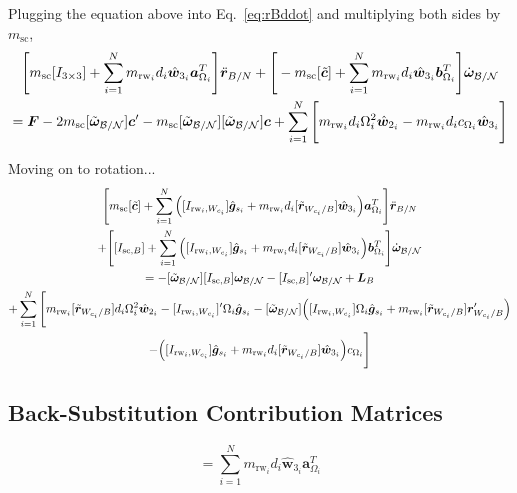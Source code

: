 \documentclass[]{BasiliskReportMemo}
\begin{document}
Plugging the equation above into Eq.~\eqref{eq:rBddot} and multiplying both sides by $m_\text{sc}$,
\begin{multline}
\Bigg[m_{\text{sc}}[I_{3\times3}] +\sum\limits_{i=1}^{N}m_{\text{rw}_i}d_i\hat{\bm{w}}_{3_i}\bm{a}_{\Omega_i}^T \Bigg]\ddot{\bm r}_{B/N}
 +\Bigg[-m_{\text{sc}}[\tilde{\bm{c}}] +\sum\limits_{i=1}^{N}m_{\text{rw}_i}d_i\hat{\bm{w}}_{3_i} \bm{b}_{\Omega_i}^T \Bigg]\dot{\bm\omega}_{\cal B/N} 
 \\=  \bm{F}   - 2m_{\text{sc}}[\tilde{\bm\omega}_{\cal B/N}]\bm{c}'-m_{\text{sc}}[\tilde{\bm\omega}_{\cal B/N}][\tilde{\bm\omega}_{\cal B/N}]\bm{c} + \sum\limits_{i=1}^{N}\Bigg[ m_{\text{rw}_i}d_i\Omega_i^2\hat{\bm{w}}_{2_i} -m_{\text{rw}_i}d_i c_{\Omega_i}\hat{\bm{w}}_{3_i} \Bigg]
\label{eq:rBddot2}
\end{multline}

Moving on to rotation...
\begin{multline}
\Bigg[m_{\text{sc}}[\tilde{\bm c}] +\sum\limits_{i=1}^{N}\Big([I_{\text{rw}_i,W_{c_i}}]\hat{\bm{g}}_{s_i} + m_{\text{rw}_i}d_i[\tilde{\bm{r}}_{W_{c_i}/B}]\hat{\bm{w}}_{3_i}\Big)\bm{a}_{\Omega_i}^T \Bigg] \ddot{\bm r}_{B/N} 
\\+ \Bigg[[I_{\text{sc},B}] + \sum\limits_{i=1}^{N}\Big([I_{\text{rw}_i,W_{c_i}}]\hat{\bm{g}}_{s_i} + m_{\text{rw}_i}d_i[\tilde{\bm{r}}_{W_{c_i}/B}]\hat{\bm{w}}_{3_i}\Big)\bm{b}_{\Omega_i}^T\Bigg]\dot{\bm\omega}_{\cal B/N} 
\\= -[\tilde{\bm\omega}_{\cal B/N}][I_{\text{sc},B}]\bm\omega_{\cal B/N}-  [I_{\text{sc},B}]'\bm\omega_{\cal B/N} + \bm{L}_B
\\
+\sum\limits_{i=1}^{N}\Bigg[ m_{\text{rw}_i}[\tilde{\bm{r}}_{W_{c_i}/B}]d_i \Omega_i^2\hat{\bm{w}}_{2_i}-[I_{\text{rw}_i,W_{c_i}}]'\Omega_i \hat{\bm{g}}_{s_i} -[\tilde{\bm\omega}_{\cal B/N}]\Big([I_{\text{rw}_i,W_{c_i}}]\Omega_i \hat{\bm{g}}_{s_i}+ m_{\text{rw}_i}[\tilde{\bm{r}}_{W_{c_i}/B}]\bm{r}'_{W_{c_i}/B}\Big)
\\-\Big([I_{\text{rw}_i,W_{c_i}}]\hat{\bm{g}}_{s_i} + m_{\text{rw}_i}d_i[\tilde{\bm{r}}_{W_{c_i}/B}]\hat{\bm{w}}_{3_i}\Big)c_{\Omega_i}\Bigg]
\label{eq:rotationalEOM2}
\end{multline}

\subsection{Back-Substitution Contribution Matrices}

\begin{equation}
[A_\text{contr}] = \sum\limits_{i=1}^{N}m_{\text{rw}_i}d_i\hat{\bm{w}}_{3_i}\bm{a}_{\Omega_i}^T
\end{equation}
\end{document}
